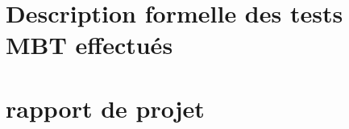 \documentclass{article}
\begin{document}
\section*{Description formelle des tests MBT effectués}

\section*{rapport de projet}
\end{document}

